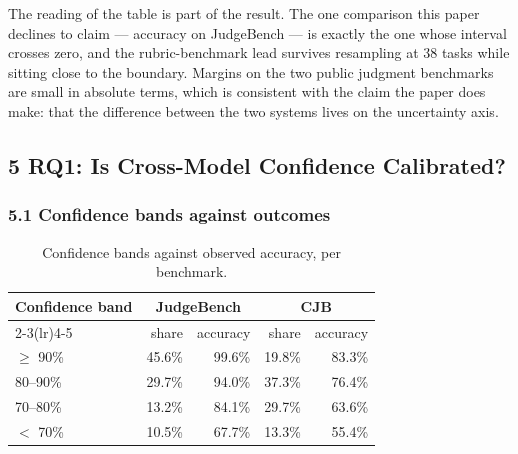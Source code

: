 \documentclass[
]{article}
\begin{document}
\begin{table}[ht]
\centering
\small
\caption{Sampling variability of the reported margins (10{,}000 bootstrap resamples over items or pairs).}
\label{tab:bootstrap}
\end{table}

The reading of the table is part of the result. The one comparison this paper declines to
claim --- accuracy on JudgeBench --- is exactly the one whose interval crosses zero, and the
rubric-benchmark lead survives resampling at 38 tasks while sitting close to the boundary.
Margins on the two public judgment benchmarks are small in absolute terms, which is
consistent with the claim the paper does make: that the difference between the two systems
lives on the uncertainty axis.

\subsection{5 RQ1: Is Cross-Model Confidence Calibrated?}\label{rq1}

\subsubsection{5.1 Confidence bands against outcomes}\label{bands}

\begin{table}[ht]
\centering
\small
\caption{Confidence bands against observed accuracy, per benchmark.}\label{tab:bands}
\begin{tabular}{@{}lrrrr@{}}
\toprule
\textbf{Confidence band} & \multicolumn{2}{c}{\textbf{JudgeBench}} & \multicolumn{2}{c}{\textbf{CJB}} \\
\cmidrule(lr){2-3}\cmidrule(lr){4-5}
 & share & accuracy & share & accuracy \\
\midrule
$\geq$ 90\% & 45.6\% & 99.6\% & 19.8\% & 83.3\% \\
80--90\% & 29.7\% & 94.0\% & 37.3\% & 76.4\% \\
70--80\% & 13.2\% & 84.1\% & 29.7\% & 63.6\% \\
$<$ 70\% & 10.5\% & 67.7\% & 13.3\% & 55.4\% \\
\bottomrule
\end{tabular}
\end{table}
\end{document}
